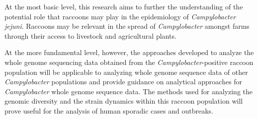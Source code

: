 \documentclass[letterpaper,titlepage,12pt]{article}
\begin{document}
At the most basic level, this research aims to further the understanding of the potential role that raccoons may play in the epidemiology of \textit{Campylobacter jejuni}. Raccoons may be relevant in the spread of \textit{Campylobacter} amongst farms through their access to livestock and agricultural plants.

At the more fundamental level, however, the approaches developed to analyze the whole genome sequencing data obtained from the \textit{Campylobacter}-positive raccoon population will be applicable to analyzing whole genome sequence data of other \textit{Campylobacter} populations and provide guidance on analytical approaches for \textit{Campylobacter} whole genome sequence data.
The methods used for analyzing the genomic diversity and the strain dynamics %
within this raccoon population will prove useful for the analysis of human sporadic cases and outbreaks. 






  
 
      



\newpage
\small

%
\printbibliography
\end{document}
